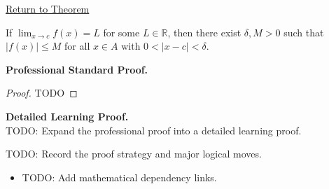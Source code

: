 \newpage
{}
\label{prf:limit-implies-local-bounding}

\begin{remark*}[Return]
\hyperref[thm:limit-implies-local-bounding]{Return to Theorem}
\end{remark*}

\begin{theorem*}
If $\lim_{x\to c}f(x)=L$ for some $L \in \mathbb{R}$, then there exist $\delta, M > 0$ such that $|f(x)| \leq M$ for all $x \in A$ with $0<|x-c|<\delta$.
\end{theorem*}

\textbf{Professional Standard Proof.}~\\
\begin{proof}
TODO
\end{proof}

\textbf{Detailed Learning Proof.}~\\
TODO: Expand the professional proof into a detailed learning proof.

\begin{remark*}
TODO: Record the proof strategy and major logical moves.
\end{remark*}

\begin{dependencies}
\begin{itemize}
  \item TODO: Add mathematical dependency links.
\end{itemize}
\end{dependencies}
